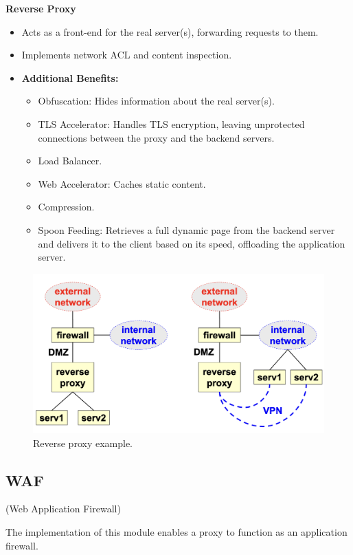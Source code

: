 \begin{center}
    \textbf{Reverse Proxy}
\end{center} 

\begin{itemize}
    \item Acts as a front-end for the real server(s), forwarding requests to them.
    \item Implements network ACL and content inspection.
    \item \textbf{Additional Benefits:}
    \begin{itemize}
        \item Obfuscation: Hides information about the real server(s).
        \item TLS Accelerator: Handles TLS encryption, leaving unprotected connections between the proxy and the backend servers.
        \item Load Balancer.
        \item Web Accelerator: Caches static content.
        \item Compression.
        \item Spoon Feeding: Retrieves a full dynamic page from the backend server and delivers it to the client based on its speed, offloading the application server.
    \end{itemize}
\end{itemize}

\begin{figure}[H]
    \centering
    \includegraphics[width=0.5\linewidth]{Images/Firewalling/reverse_proxy.png}
    \caption{Reverse proxy example.}
\end{figure}

\subsection{WAF}
\begin{center}
(Web Application Firewall)
\end{center}

\begin{tcolorbox}[colback=blue!10!white, colframe=blue!50!white]
    The implementation of this module enables a proxy to function as an application firewall.
\end{tcolorbox}

